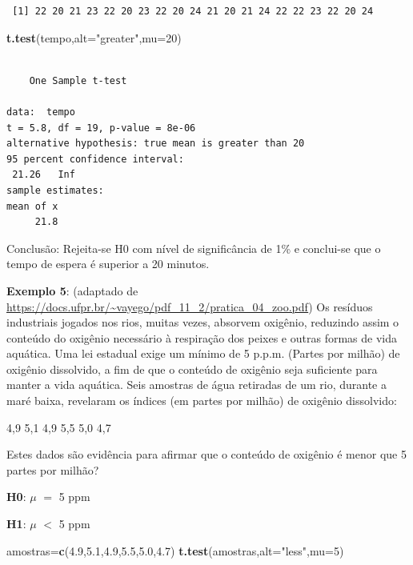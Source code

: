 \documentclass[12pt,portuguese,oneside]{book}
\newenvironment{Shaded}{\begin{snugshade}}{\end{snugshade}}
\newcommand{\KeywordTok}[1]{\textcolor[rgb]{0.13,0.29,0.53}{\textbf{#1}}}
\newcommand{\DataTypeTok}[1]{\textcolor[rgb]{0.13,0.29,0.53}{#1}}
\newcommand{\DecValTok}[1]{\textcolor[rgb]{0.00,0.00,0.81}{#1}}
\newcommand{\FloatTok}[1]{\textcolor[rgb]{0.00,0.00,0.81}{#1}}
\newcommand{\StringTok}[1]{\textcolor[rgb]{0.31,0.60,0.02}{#1}}
\newcommand{\NormalTok}[1]{#1}
\begin{document}
\begin{verbatim}
 [1] 22 20 21 23 22 20 23 22 20 24 21 20 21 24 22 22 23 22 20 24
\end{verbatim}

\begin{Shaded}
\begin{Highlighting}[]
\KeywordTok{t.test}\NormalTok{(tempo,}\DataTypeTok{alt=}\StringTok{"greater"}\NormalTok{,}\DataTypeTok{mu=}\DecValTok{20}\NormalTok{)}
\end{Highlighting}
\end{Shaded}

\begin{verbatim}

    One Sample t-test

data:  tempo
t = 5.8, df = 19, p-value = 8e-06
alternative hypothesis: true mean is greater than 20
95 percent confidence interval:
 21.26   Inf
sample estimates:
mean of x 
     21.8 
\end{verbatim}

Conclusão: Rejeita-se H0 com nível de significância de 1\% e conclui-se
que o tempo de espera é superior a 20 minutos.

\textbf{Exemplo 5}: (adaptado de
\url{https://docs.ufpr.br/~vayego/pdf_11_2/pratica_04_zoo.pdf}) Os
resíduos industriais jogados nos rios, muitas vezes, absorvem oxigênio,
reduzindo assim o conteúdo do oxigênio necessário à respiração dos
peixes e outras formas de vida aquática. Uma lei estadual exige um
mínimo de 5 p.p.m. (Partes por milhão) de oxigênio dissolvido, a fim de
que o conteúdo de oxigênio seja suficiente para manter a vida aquática.
Seis amostras de água retiradas de um rio, durante a maré baixa,
revelaram os índices (em partes por milhão) de oxigênio dissolvido:

4,9 5,1 4,9 5,5 5,0 4,7

Estes dados são evidência para afirmar que o conteúdo de oxigênio é
menor que 5 partes por milhão?

\textbf{H0}: \(\mu\) \(=\) 5 ppm

\textbf{H1}: \(\mu\) \(<\) 5 ppm

\begin{Shaded}
\begin{Highlighting}[]
\NormalTok{amostras=}\KeywordTok{c}\NormalTok{(}\FloatTok{4.9}\NormalTok{,}\FloatTok{5.1}\NormalTok{,}\FloatTok{4.9}\NormalTok{,}\FloatTok{5.5}\NormalTok{,}\FloatTok{5.0}\NormalTok{,}\FloatTok{4.7}\NormalTok{)}
\KeywordTok{t.test}\NormalTok{(amostras,}\DataTypeTok{alt=}\StringTok{"less"}\NormalTok{,}\DataTypeTok{mu=}\DecValTok{5}\NormalTok{)}
\end{Highlighting}
\end{Shaded}
\end{document}
